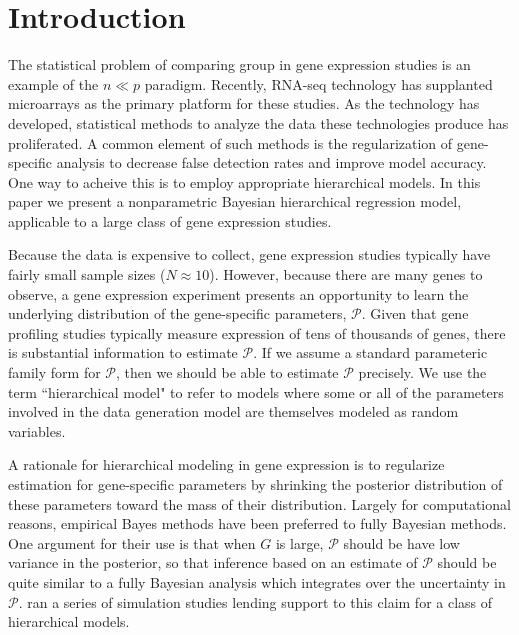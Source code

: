 \section{Introduction}
The statistical problem of comparing group in gene expression studies is an example of the $n \ll p$ paradigm. Recently, RNA-seq technology has supplanted microarrays as the primary platform for these studies. As the technology has developed, statistical methods to analyze the data these technologies produce has proliferated. A common element of such methods is the regularization of gene-specific analysis to decrease false detection rates and improve model accuracy. One way to acheive this is to employ appropriate hierarchical models. In this paper we present a nonparametric Bayesian hierarchical regression model, applicable to a large class of gene expression studies.


Because the data is expensive to collect, gene expression studies typically have fairly small sample sizes ($N \approx 10$). However, because there are many genes to observe, a gene expression experiment presents an opportunity to learn the underlying distribution of the gene-specific parameters, $\mathcal{P}$. Given that gene profiling studies typically measure expression of tens of thousands of genes, there is substantial information to estimate $\mathcal{P}$. If we assume a standard parameteric family form for $\mathcal{P}$, then we should be able to estimate $\mathcal{P}$ precisely. We use the term ``hierarchical model" to refer to models where some or all of the parameters involved in the data generation model are themselves modeled as random variables.

A rationale for hierarchical modeling in gene expression is to regularize estimation for gene-specific parameters by shrinking the posterior distribution of these parameters toward the mass of their distribution. Largely for computational reasons, empirical Bayes methods have been preferred to fully Bayesian methods. One argument for their use is that when $G$ is large, $\mathcal{P}$ should be have low variance in the posterior, so that inference based on an estimate of $\mathcal{P}$ should be quite similar to a fully Bayesian analysis which integrates over the uncertainty in $\mathcal{P}$. \citet{landau2016high} ran a series of simulation studies lending support to this claim for a class of hierarchical models.

